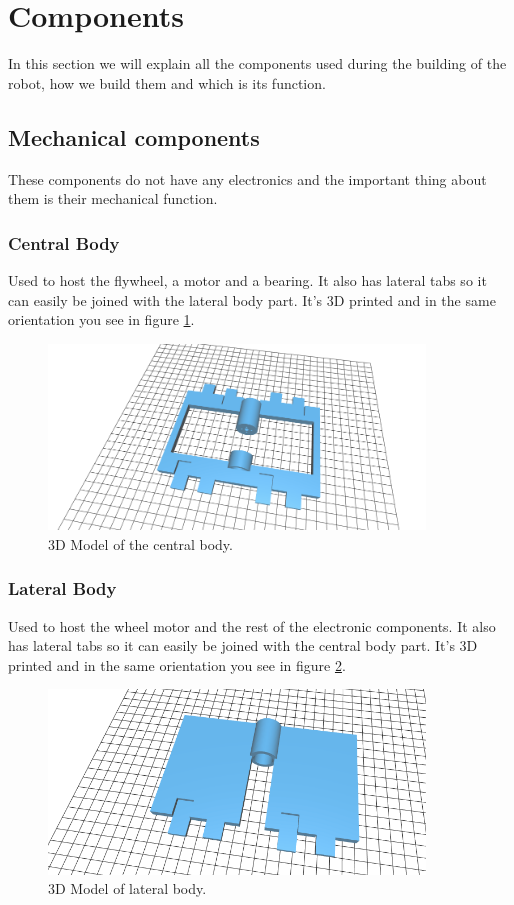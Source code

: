 \section{Components}
In this section we will explain all the components
used during the building of the robot, how we build them and which is
its function.

\subsection{Mechanical components}
These components do not have any electronics and the important
thing about them is their mechanical function.
\subsubsection{Central Body}

Used to host the flywheel, a motor and a bearing. It also has lateral
tabs so it can easily be joined with the lateral body part.
It's 3D printed and in the same orientation you see in figure
\ref{fig: central body}.
\begin{figure}[H]
    \centering
    \includegraphics[width=10cm]{img/components/central_body.png}
    \caption{3D Model of the central body.}
    \label{fig: central body}
\end{figure}

\subsubsection{Lateral Body}
Used to host the wheel motor and the rest of the electronic components.
It also has lateral tabs so it can easily be joined with the central body part.
It's 3D printed and in the same orientation you see in figure
\ref{fig: lateral body}.
\begin{figure}[H]
    \centering
    \includegraphics[width=10cm]{img/components/lateral_body.png}
    \caption{3D Model of lateral body.}
    \label{fig: lateral body}
\end{figure}
